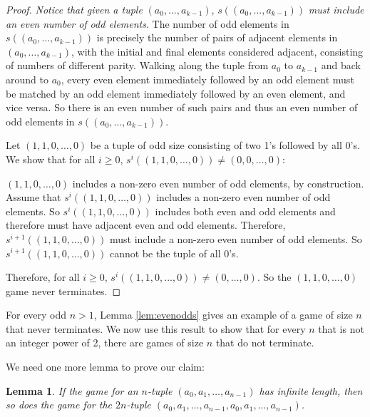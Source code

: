 \documentclass[12pt]{amsart}
\newtheorem{lemma}[theorem]{Lemma}
\newcommand{\diff}{s}
\begin{document}
\begin{proof}
\emph{Notice that given a tuple} $(a_0, \ldots, a_{k-1})$,  $\diff ((a_0, \ldots, a_{k-1}))$ \emph{must include an even number of odd elements}. The number of odd elements in $\diff ((a_0, \ldots, a_{k-1}))$ is precisely the number of pairs of adjacent elements in  $(a_0, \ldots, a_{k-1})$, with the initial and final elements considered adjacent, consisting of numbers of different parity. Walking along the tuple from $a_0$ to $a_{k-1}$ and back around to $a_0$, every even element immediately followed by an odd element must be matched by an odd element immediately followed by an even element, and vice versa. So there is an even number of such pairs and thus an even number of odd elements in  $\diff((a_0, \ldots, a_{k-1}))$.

Let $(1, 1, 0, \ldots, 0)$ be a tuple of odd size consisting of two 1's followed by all 0's. We show that for all $i \geq 0$, $\diff^{i}((1, 1, 0, \ldots, 0)) \neq (0, 0, \ldots, 0)$:

$(1, 1, 0, \ldots, 0)$ includes a non-zero even number of odd elements, by construction. Assume that $\diff^i((1, 1, 0, \ldots, 0))$ includes a non-zero even number of odd elements. So $\diff^i((1, 1, 0, \ldots, 0))$ includes both even and odd elements and therefore must have adjacent even and odd elements. Therefore, $\diff^{i+1}((1, 1, 0, \ldots, 0))$ must include a non-zero even number of odd elements. So  $\diff^{i+1}((1, 1, 0, \ldots, 0))$ cannot be the tuple of all $0$'s.

Therefore, for all $i \geq 0$, $\diff^i((1, 1, 0, \ldots, 0)) \neq (0, \ldots, 0)$. So the $(1, 1, 0, \ldots, 0)$ game never terminates.
\end{proof}

For every odd $n > 1$, Lemma \ref{lem:evenodds} gives an example of a game of size $n$ that never terminates. We now use this result to show that for every $n$ that is not an integer power of 2, there are games of size $n$ that do not terminate.

We need one more lemma to prove our claim:

\begin{lemma}
\label{lem:doubles}
If the game for an $n$-tuple $(a_0, a_1, \ldots, a_{n-1})$ has infinite length, then so does the game for the $2n$-tuple $(a_0, a_1, \ldots, a_{n-1}, a_0, a_1, \ldots, a_{n-1})$.
\end{lemma}
\end{document}
